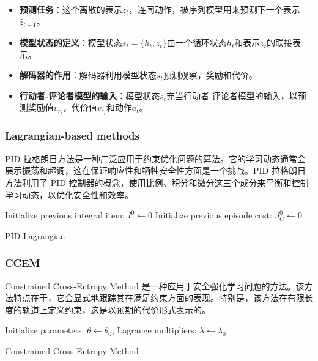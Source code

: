 \documentclass[10pt,mathserif]{beamer}%
\begin{document}
\begin{frame}[t, fragile]
{\begin{itemize}
\item \textbf{预测任务}：这个离散的表示$z_t$，连同动作，被序列模型用来预测下一个表示$\hat{z}_{t+1}$。
\item \textbf{模型状态的定义}：模型状态$s_t=\{h_t, z_t\}$由一个循环状态$h_t$和表示$z_t$的联接表示。
\item \textbf{解码器的作用}：解码器利用模型状态$s_t$预测观察，奖励和代价。
\item \textbf{行动者-评论者模型的输入}：模型状态$s_t$充当行动者-评论者模型的输入，以预测奖励值$v_{r_t}$，代价值$v_{c_t}$和动作$a_t$。
\end{itemize}
}
\end{frame}

\begin{frame}[fragile]
	\frametitle{Lagrangian-based methods}
	PID 拉格朗日方法是一种广泛应用于约束优化问题的算法。它的学习动态通常会展示振荡和超调，这在保证响应性和牺牲安全性方面是一个挑战。PID 拉格朗日方法利用了 PID 控制器的概念，使用比例、积分和微分这三个成分来平衡和控制学习动态，以优化安全性和效率。
	\begin{algorithm}[H]
		\SetAlgoLined
		
		Initialize previous integral item: $I^0 \leftarrow 0$\;
		Initialize previous episode cost: $J_C^0 \leftarrow 0$\;
		\caption{PID Lagrangian}
		\label{alg: pid_lag}
		\end{algorithm}
\end{frame}

\begin{frame}[t, fragile]
	\frametitle{CCEM}
 Constrained Cross-Entropy Method 是一种应用于安全强化学习问题的方法。该方法特点在于，它会显式地跟踪其在满足约束方面的表现。特别是，该方法在有限长度的轨道上定义约束，这是以预期的代价形式表示的。
	\begin{algorithm}[H]
	\SetAlgoLined
	Initialize parameters: $\theta \leftarrow \theta_0$, Lagrange multipliers: $\lambda \leftarrow \lambda_0$\;
	\caption{Constrained Cross-Entropy Method}
	\end{algorithm}
	\end{frame}
\end{document}

